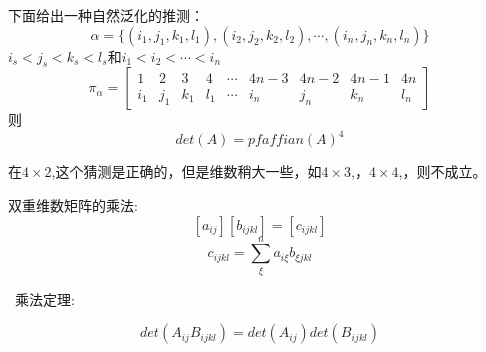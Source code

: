 \documentclass{amsc}          %
\numberwithin{equation}{section} %
\begin{document}
下面给出一种自然泛化的推测：
$$\alpha =\{(i_{1},j_{1},k_{1},l_{1}),(i_{2},j_{2},k_{2},l_{2}),\cdots ,(i_{n},j_{n},k_{n},l_{n})\}$$
$i_{s}<j_{s}<k_{s}<l_{s}$和$i_{1}<i_{2}<\cdots <i_{n}$
$${\displaystyle \pi _{\alpha }={\begin{bmatrix}1&2&3&4&\cdots &4n-3&4n-2&4n-1&4n\\i_{1}&j_{1}&k_{1}&l_{1}&\cdots &i_{n}&j_{n}&k_{n}&l_{n}\end{bmatrix}}}$$
则
$$det(A)=pfaffian(A)^{4}$$

在$4 \times 2$,\cite{VAL42}这个猜测是正确的，但是维数稍大一些，如$4 \times 3$,\cite{VAL34}，$4 \times 4$,\cite{VAL44}，则不成立。


\begin{definition}  双重维数矩阵的乘法:
   $$[a_{ij}][b_{ijkl}]=[c_{ijkl}]$$
   $$c_{ijkl} = \sum_{\xi}^{n}a_{i\xi}b_{\xi jkl}$$
\end{definition}

\begin{theorem}\   乘法定理:

    $$det(A_{ij}B_{ijkl})=det(A_{ij})det(B_{ijkl})$$
\end{theorem}
\end{document}
